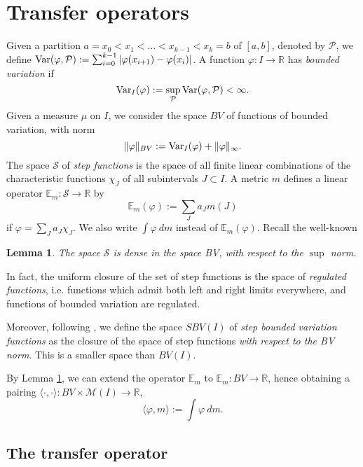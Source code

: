 \documentclass[11pt]{amsart}
\newtheorem{lemma}[theorem]{Lemma}
\begin{document}
\section{Transfer operators} \label{S:transfer}

Given a partition  $a = x_0 < x_1 < \dots < x_{k-1} < x_k = b$ of $[a, b]$, denoted by $\mathcal{P}$, we define 
$\textup{Var}(\varphi, \mathcal{P}) :=  \sum_{i = 0}^{k-1} |\varphi(x_{i+1}) - \varphi(x_i)|$.
A function $\varphi : I \to \mathbb{R}$ has \emph{bounded variation} if 
$$\textup{Var}_I (\varphi) := \sup_{\mathcal{P}} \textup{Var}(\varphi, \mathcal{P}) < \infty.$$ 
Given a measure $\mu$ on $I$, we consider the space $BV$ of functions of bounded variation, 
with norm 
$$\Vert \varphi \Vert_{BV} := \textup{Var}_I (\varphi) + \Vert \varphi \Vert_\infty.$$
The space $\mathcal{S}$ of \emph{step functions} is the space of all finite linear combinations 
of the characteristic functions $\chi_J$ of all subintervals $J \subset I$. 
A metric $m$ defines a linear operator $\mathbb{E}_m : \mathcal{S} \to \mathbb{R}$ by
$$\mathbb{E}_m(\varphi) := \sum_J a_J m(J)$$
if $\varphi = \sum_J a_J \chi_J$. We also write $\int \varphi \ dm$ instead of $\mathbb{E}_m(\varphi)$. 
Recall the well-known

\begin{lemma}  \label{L:dense}
The space $\mathcal{S}$ is dense in the space BV, with respect to the $\sup$ norm.
\end{lemma}

In fact, the uniform closure of the set of step functions is the space of \emph{regulated functions}, i.e. functions 
which admit both left and right limits everywhere, and functions of bounded variation are regulated.

Moreover, following \cite{Rugh}, we define the space $SBV(I)$ of \emph{step bounded variation functions} as the closure of the space of step functions \emph{with respect to the BV norm}. This is a smaller space than $BV(I)$. 

By Lemma \ref{L:dense}, we can extend the operator $\mathbb{E}_m$ to $\mathbb{E}_m : BV \to \mathbb{R}$, hence obtaining a
pairing $\langle \cdot, \cdot \rangle : BV \times \mathcal{M}(I) \to \mathbb{R}$,
$$\langle \varphi, m \rangle := \int \varphi \ dm.$$

\subsection{The transfer operator}
\end{document}
